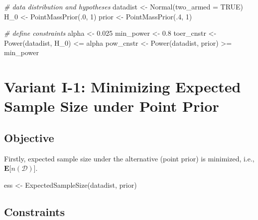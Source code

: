 \documentclass[
]{book}
\newenvironment{Shaded}{\begin{snugshade}}{\end{snugshade}}
\newcommand{\AttributeTok}[1]{\textcolor[rgb]{0.77,0.63,0.00}{#1}}
\newcommand{\CommentTok}[1]{\textcolor[rgb]{0.56,0.35,0.01}{\textit{#1}}}
\newcommand{\ConstantTok}[1]{\textcolor[rgb]{0.00,0.00,0.00}{#1}}
\newcommand{\DecValTok}[1]{\textcolor[rgb]{0.00,0.00,0.81}{#1}}
\newcommand{\FloatTok}[1]{\textcolor[rgb]{0.00,0.00,0.81}{#1}}
\newcommand{\FunctionTok}[1]{\textcolor[rgb]{0.00,0.00,0.00}{#1}}
\newcommand{\NormalTok}[1]{#1}
\newcommand{\OtherTok}[1]{\textcolor[rgb]{0.56,0.35,0.01}{#1}}
\newcommand{\SpecialCharTok}[1]{\textcolor[rgb]{0.00,0.00,0.00}{#1}}
\begin{document}
\begin{Shaded}
\begin{Highlighting}[]
\CommentTok{\# data distribution and hypotheses}
\NormalTok{datadist   }\OtherTok{\textless{}{-}} \FunctionTok{Normal}\NormalTok{(}\AttributeTok{two\_armed =} \ConstantTok{TRUE}\NormalTok{)}
\NormalTok{H\_0        }\OtherTok{\textless{}{-}} \FunctionTok{PointMassPrior}\NormalTok{(.}\DecValTok{0}\NormalTok{, }\DecValTok{1}\NormalTok{)}
\NormalTok{prior      }\OtherTok{\textless{}{-}} \FunctionTok{PointMassPrior}\NormalTok{(.}\DecValTok{4}\NormalTok{, }\DecValTok{1}\NormalTok{)}

\CommentTok{\# define constraints}
\NormalTok{alpha      }\OtherTok{\textless{}{-}} \FloatTok{0.025}
\NormalTok{min\_power  }\OtherTok{\textless{}{-}} \FloatTok{0.8}
\NormalTok{toer\_cnstr }\OtherTok{\textless{}{-}} \FunctionTok{Power}\NormalTok{(datadist, H\_0)   }\SpecialCharTok{\textless{}=}\NormalTok{ alpha}
\NormalTok{pow\_cnstr  }\OtherTok{\textless{}{-}} \FunctionTok{Power}\NormalTok{(datadist, prior) }\SpecialCharTok{\textgreater{}=}\NormalTok{ min\_power}
\end{Highlighting}
\end{Shaded}

\hypertarget{variantI_1}{%
\section{Variant I-1: Minimizing Expected Sample Size under Point Prior}\label{variantI_1}}

\hypertarget{objective}{%
\subsection{Objective}\label{objective}}

Firstly, expected sample size under the alternative (point prior)
is minimized, i.e.,
\(\boldsymbol{E}\big[n(\mathcal{D})\big]\).

\begin{Shaded}
\begin{Highlighting}[]
\NormalTok{ess }\OtherTok{\textless{}{-}} \FunctionTok{ExpectedSampleSize}\NormalTok{(datadist, prior)}
\end{Highlighting}
\end{Shaded}

\hypertarget{constraints}{%
\subsection{Constraints}\label{constraints}}
\end{document}
